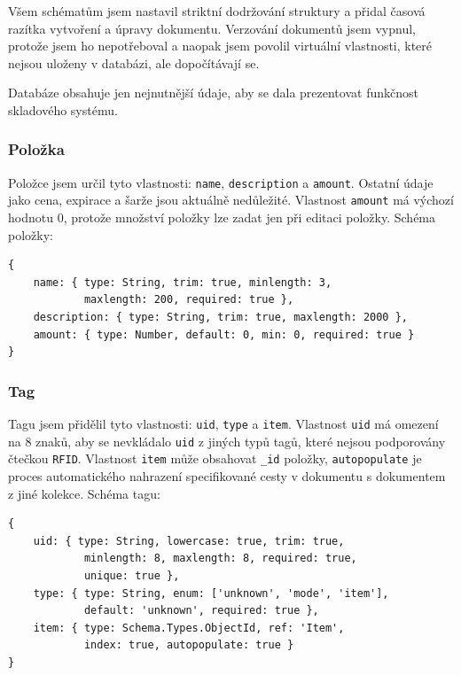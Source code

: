 \documentclass[czech,BP]{thesiskiv}
\begin{document}
	Všem schématům jsem nastavil striktní dodržování struktury a přidal časová razítka vytvoření a úpravy dokumentu.
	Verzování dokumentů jsem vypnul, protože jsem ho nepotřeboval a naopak jsem povolil virtuální vlastnosti, které nejsou uloženy v databázi, ale dopočítávají se.
	
	Databáze obsahuje jen nejnutnější údaje, aby se dala prezentovat funkčnost skladového systému. 	
	
	
	\subsubsection{Položka}
Položce jsem určil tyto vlastnosti: \texttt{name}, \texttt{description} a \texttt{amount}. Ostatní údaje jako cena, expirace a šarže jsou aktuálně nedůležité. Vlastnost \texttt{amount} má výchozí hodnotu 0, protože množství položky lze zadat jen při editaci položky. 
Schéma položky:	
\begin{verbatim}
{
    name: { type: String, trim: true, minlength: 3,
            maxlength: 200, required: true },
    description: { type: String, trim: true, maxlength: 2000 },
    amount: { type: Number, default: 0, min: 0, required: true }
}
\end{verbatim}

	\subsubsection{Tag}
Tagu jsem přidělil tyto vlastnosti: \texttt{uid}, \texttt{type} a \texttt{item}. Vlastnost \texttt{uid} má omezení na 8 znaků, aby se nevkládalo \texttt{uid} z jiných typů tagů, které nejsou podporovány čtečkou \texttt{RFID}.
Vlastnost \texttt{item} může obsahovat \texttt{\_id} položky, \texttt{autopopulate} je proces automatického nahrazení specifikované cesty v dokumentu s dokumentem z jiné kolekce.
Schéma tagu:
\begin{verbatim}
{
    uid: { type: String, lowercase: true, trim: true,
            minlength: 8, maxlength: 8, required: true,
            unique: true },
    type: { type: String, enum: ['unknown', 'mode', 'item'],
            default: 'unknown', required: true },
    item: { type: Schema.Types.ObjectId, ref: 'Item',
            index: true, autopopulate: true }
}
\end{verbatim}
	
\end{document}
